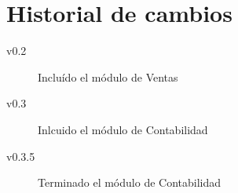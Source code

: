 \chapter*{Historial de cambios}
\begin{description}
  \item[v0.2] Incluído el módulo de Ventas
  \item[v0.3] Inlcuido el módulo de Contabilidad
  \item[v0.3.5] Terminado el módulo de Contabilidad
\end{description}
